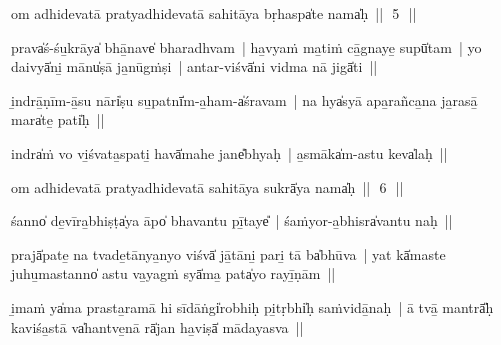 \documentclass[parskip, DIV=14]{scrartcl}
\begin{document}
{%

om adhidevatā pratyadhidevatā sahitāya bṛha॒spa̍te॒ nama̍ḥ~||~\,5\,~||
\vspace{0.5cm}


prava̍ś-śu̱krāya̍ bhā̱nave̍ bharadhvam~| ha̱vyaṁ ma̱tiṁ cā̱gnaye̱ supū̍tam~| yo daivyā̍ni̱ mānu̍ṣā ja̱nūgṁṣi~| a॒ntar-viśvā̍ni vi॒dma nā॒ jigā̍ti~||


i̱ndrā̱ṇīm-ā̱su nāri̍ṣu su̱patnī̍m-a̱ham-a̍śravam~| na hya̍syā apa̱rañca̱na ja̱rasā̱ mara̍te̱ pati̍ḥ~||


indra̍ṁ vo vi̱śvata̱spati̱ havā̍mahe jane̎bhyaḥ~| a̱smāka̍m-astu keva̍laḥ~||


om adhidevatā pratyadhidevatā sahitāya sukrā̍ya॒ nama̍ḥ~||~\,6\,~||
\vspace{0.5cm}

śanno̍ de̱vīra̱bhiṣṭa̍ya॒ āpo̍ bhavantu pī̱taye̎~| śaṁyor-a̱bhisra̍vantu naḥ~||


prajā̍pate̱ na tvade̱tānya̱nyo viśvā̍ jā̱tāni̱ pari̱ tā ba̍bhūva~| yat kā̍maste juhu̱mastanno̍ astu va̱yagṁ syā̍ma̱ pata̍yo rayī̱ṇām~||


i̱maṁ ya̍ma prasta̱ramā hi sīdāṅgi̍robhiḥ pi̱tṛbhi̍ḥ saṁvidā̱naḥ~| ā tvā̱ mantrā̎ḥ kaviśa̱stā va̍hantve̱nā rā̍jan ha̱viṣā̍ mādayasva~||

}
\end{document}
